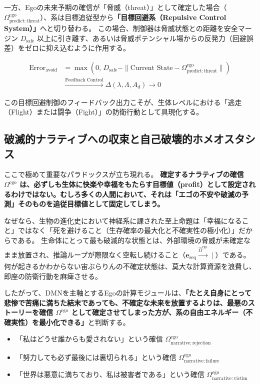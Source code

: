 一方、Egoの未来予期の確信が「脅威（threat）」として確定した場合（$\Omega^{\mathrm{ego}}_{\mathrm{predict:threat}}$）、系は目標追従型から\textbf{「目標回避系（Repulsive Control System）」}へと切り替わる。
この場合、制御器は脅威状態との距離を安全マージン $D_{\mathrm{safe}}$ 以上に引き離す、あるいは脅威ポテンシャル場からの反発力（回避誤差）をゼロに抑え込むように作用する。

\begin{align}
    \text{Error}_{\mathrm{avoid}} &= \max\left( 0,\, D_{\mathrm{safe}} - \| \text{Current State} - \Omega^{\mathrm{ego}}_{\mathrm{predict:threat}} \| \right) \\
                                  &\xrightarrow{\text{Feedback Control}} \Delta (\lambda, \Lambda, A_d) \longrightarrow 0
\end{align}

この目標回避制御のフィードバック出力こそが、生体レベルにおける「逃走（Flight）または闘争（Fight）」の防衛行動として具現化する。

\subsection{破滅的ナラティブへの収束と自己破壊的ホメオスタシス}

ここで極めて重要なパラドックスが立ち現れる。
\textbf{確定するナラティブの確信 $\Omega^{\mathrm{ego}}$ は、必ずしも生体に快楽や幸福をもたらす目標値（profit）として設定されるわけではない。むしろ多くの人間において、それは「エゴの不安や破滅の予測」そのものを追従目標値として固定してしまう。}

なぜなら、生物の進化史において神経系に課された至上命題は「幸福になること」ではなく「死を避けること（生存確率の最大化と不確実性の極小化）」だからである。
生命体にとって最も破滅的な状態とは、外部環境の脅威が未確定なまま放置され、推論ループが際限なく空転し続けること（$\boldsymbol{e}_{\mathrm{seq}} \xrightarrow[]{\hat{\Omega}^{\mathrm{ego}}} \mid$）である。何が起きるかわからない宙ぶらりんの不確定状態は、莫大な計算資源を浪費し、即座の防衛行動を麻痺させる。

したがって、DMNを主軸とするEgoの計算モジュールは、\textbf{「たとえ自身にとって悲惨で苦痛に満ちた結末であっても、不確定な未来を放置するよりは、最悪のストーリーを確信 $\Omega^{\mathrm{ego}}$ として確定させてしまった方が、系の自由エネルギー（不確実性）を最小化できる」}と判断する。

\begin{itemize}
    \item 「私はどうせ誰からも愛されない」という確信 $\Omega^{\mathrm{ego}}_{\mathrm{narrative:rejection}}$
    \item 「努力しても必ず最後には裏切られる」という確信 $\Omega^{\mathrm{ego}}_{\mathrm{narrative:failure}}$
    \item 「世界は悪意に満ちており、私は被害者である」という確信 $\Omega^{\mathrm{ego}}_{\mathrm{narrative:victim}}$
\end{itemize}

